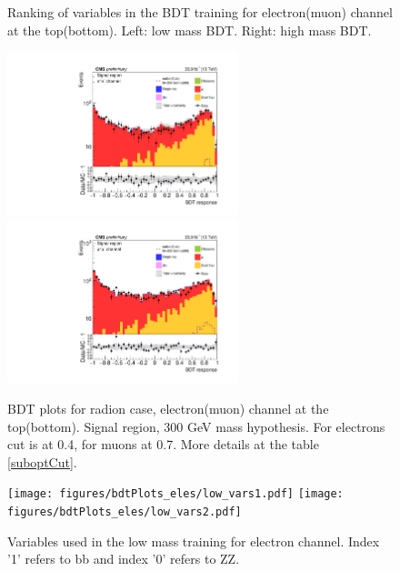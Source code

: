\begin{figure}[tbp]
\begin{center}
    \caption{ Ranking of variables in the BDT training for electron(muon) channel at the top(bottom). Left: low mass BDT. Right: high mass BDT.}
    \label{fig:ranking}
  \end{center}
\end{figure}


\begin{figure}[tbp]
  \begin{center}
   \includegraphics[width=0.6\textwidth]{figures/bdt_response_ee_SR_FullPostfit_plot_nov16_2_radion.pdf}\\
   \includegraphics[width=0.6\textwidth]{figures/bdt_response_mm_SR_FullPostfit_plot_nov16_2_radion.pdf}\\
    \caption{ BDT plots for radion case, electron(muon) channel at the top(bottom). Signal region, 300 GeV mass hypothesis. For electrons cut is at 0.4, for muons at 0.7. More details at the table \ref{suboptCut}.}
    \label{fig:BDTs}
  \end{center}
\end{figure}




\begin{figure}[tbp]
  \begin{center}
   \texttt{[image: figures/bdtPlots\_eles/low\_vars1.pdf]}
   \texttt{[image: figures/bdtPlots\_eles/low\_vars2.pdf]}
    \caption{ Variables used in the low mass training for electron channel. Index '1' refers to bb and index '0' refers to ZZ.}
    \label{fig:ele_lowVars}
  \end{center}
\end{figure}



